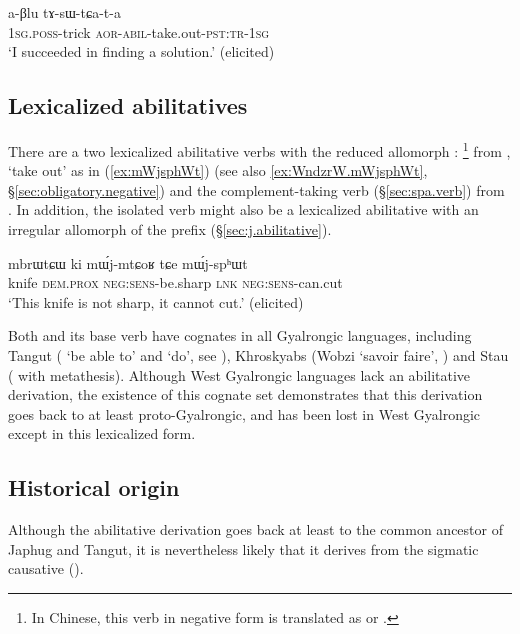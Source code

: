 \begin{exe}
\ex \label{ex:aBlu.tAsWtCAta}
 \gll  a-βlu tɤ-sɯ-tɕa-t-a \\
  \textsc{1sg}.\textsc{poss}-trick \textsc{aor}-\textsc{abil}-take.out-\textsc{pst}:\textsc{tr}-\textsc{1sg} \\
\glt `I succeeded in finding a solution.' (elicited)
\end{exe} 
 
\subsection{Lexicalized abilitatives} \label{sec:abilitative.lexicalized}
There are a two lexicalized abilitative verbs with the reduced allomorph : \footnote{In Chinese, this verb in negative form is translated as  or  . } from , `take out' as in (\ref{ex:mWjsphWt}) (see also \ref{ex:WndzrW.mWjsphWt}, §\ref{sec:obligatory.negative}) and the complement-taking verb  (§\ref{sec:spa.verb}) from  . In addition, the isolated verb  might also be a lexicalized abilitative with an irregular allomorph of the prefix (§\ref{sec:j.abilitative}).

 \begin{exe}
\ex \label{ex:mWjsphWt}
 \gll mbrɯtɕɯ ki mɯ́j-mtɕoʁ tɕe mɯ́j-spʰɯt \\
 knife \textsc{dem}.\textsc{prox} \textsc{neg}:\textsc{sens}-be.sharp \textsc{lnk} \textsc{neg}:\textsc{sens}-can.cut \\
 \glt `This knife is not sharp, it cannot cut.' (elicited)
\end{exe}

Both  and its base verb   have cognates in all Gyalrongic languages, including Tangut ( `be able to' and   `do', see \citealt[86;255-256]{jacques14esquisse}), Khroskyabs (Wobzi  `savoir faire', \citealt[475]{lai17khroskyabs}) and Stau ( with metathesis). Although West Gyalrongic languages lack an abilitative derivation, the existence of this cognate set demonstrates that this derivation goes back  to at least proto-Gyalrongic, and has been lost in West Gyalrongic except in this lexicalized form.
 
\subsection{Historical origin} \label{sec:abilitative.origin}
Although the abilitative derivation goes back at least to the common ancestor of Japhug and Tangut, it is nevertheless likely that it derives from the sigmatic causative (\citealt[190]{jacques15causative}).

